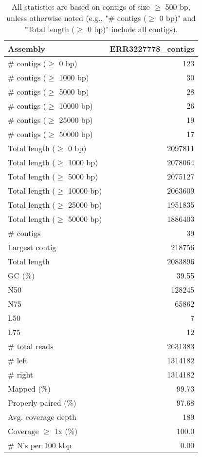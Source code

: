 \documentclass[12pt,a4paper]{article}
\begin{document}
\begin{table}[ht]
\begin{center}
\caption{All statistics are based on contigs of size $\geq$ 500 bp, unless otherwise noted (e.g., "\# contigs ($\geq$ 0 bp)" and "Total length ($\geq$ 0 bp)" include all contigs).}
\begin{tabular}{|l*{1}{|r}|}
\hline
Assembly & ERR3227778\_contigs \\ \hline
\# contigs ($\geq$ 0 bp) & 123 \\ \hline
\# contigs ($\geq$ 1000 bp) & 30 \\ \hline
\# contigs ($\geq$ 5000 bp) & 28 \\ \hline
\# contigs ($\geq$ 10000 bp) & 26 \\ \hline
\# contigs ($\geq$ 25000 bp) & 19 \\ \hline
\# contigs ($\geq$ 50000 bp) & 17 \\ \hline
Total length ($\geq$ 0 bp) & 2097811 \\ \hline
Total length ($\geq$ 1000 bp) & 2078064 \\ \hline
Total length ($\geq$ 5000 bp) & 2075127 \\ \hline
Total length ($\geq$ 10000 bp) & 2063609 \\ \hline
Total length ($\geq$ 25000 bp) & 1951835 \\ \hline
Total length ($\geq$ 50000 bp) & 1886403 \\ \hline
\# contigs & 39 \\ \hline
Largest contig & 218756 \\ \hline
Total length & 2083896 \\ \hline
GC (\%) & 39.55 \\ \hline
N50 & 128245 \\ \hline
N75 & 65862 \\ \hline
L50 & 7 \\ \hline
L75 & 12 \\ \hline
\# total reads & 2631383 \\ \hline
\# left & 1314182 \\ \hline
\# right & 1314182 \\ \hline
Mapped (\%) & 99.73 \\ \hline
Properly paired (\%) & 97.68 \\ \hline
Avg. coverage depth & 189 \\ \hline
Coverage $\geq$ 1x (\%) & 100.0 \\ \hline
\# N's per 100 kbp & 0.00 \\ \hline
\end{tabular}
\end{center}
\end{table}
\end{document}
